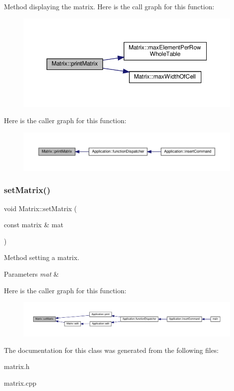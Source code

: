 Method displaying the matrix. Here is the call graph for this function\+:
\nopagebreak
\begin{figure}[H]
\begin{center}
\leavevmode
\includegraphics[width=350pt]{class_matrix_aa1967ad240a5ffaf492800044b7275d9_cgraph}
\end{center}
\end{figure}
Here is the caller graph for this function\+:
\nopagebreak
\begin{figure}[H]
\begin{center}
\leavevmode
\includegraphics[width=350pt]{class_matrix_aa1967ad240a5ffaf492800044b7275d9_icgraph}
\end{center}
\end{figure}
\mbox{\label{class_matrix_a8c45dd1354fa25e14065cab23f3074c0}} 
\subsubsection{\texorpdfstring{set\+Matrix()}{setMatrix()}}
{\footnotesize\ttfamily void Matrix\+::set\+Matrix (\begin{DoxyParamCaption}\item[{const matrix \&}]{mat }\end{DoxyParamCaption})\hspace{0.3cm}{\ttfamily [inline]}}

Method setting a matrix. 
\begin{DoxyParams}{Parameters}
{\em mat} & \\
\hline
\end{DoxyParams}
Here is the caller graph for this function\+:
\nopagebreak
\begin{figure}[H]
\begin{center}
\leavevmode
\includegraphics[width=350pt]{class_matrix_a8c45dd1354fa25e14065cab23f3074c0_icgraph}
\end{center}
\end{figure}


The documentation for this class was generated from the following files\+:\begin{DoxyCompactItemize}
\item 
matrix.\+h\item 
matrix.\+cpp\end{DoxyCompactItemize}
